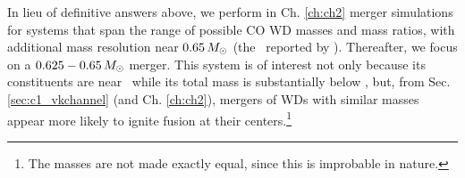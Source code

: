 In lieu of definitive answers above, we perform in Ch. \ref{ch:ch2} merger simulations for systems that span the range of possible CO WD masses and mass ratios, with additional mass resolution near $0.65\,\Msun$ (the \Mmean\ reported by \citealt{tremb09}).  Thereafter, we focus on a $0.625-0.65\,\Msun$ merger.  This system is of interest not only because its constituents are near \Mmean\ while its total mass is substantially below \Mch, but, from Sec. \ref{sec:c1_vkchannel} (and Ch. \ref{ch:ch2}), mergers of WDs with similar masses appear more likely to ignite fusion at their centers.\footnote{The masses are not made exactly equal, since this is improbable in nature.}


